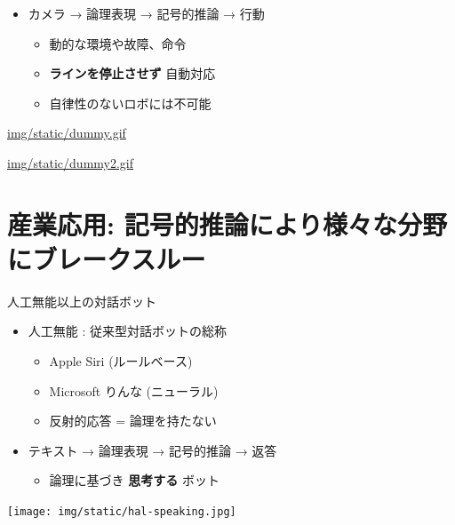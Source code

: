 \begin{container-fluid}
\begin{row-fluid}
\begin{span8}
\begin{itemize}
\item カメラ → 論理表現 → 記号的推論 → 行動

\begin{itemize}
\item 動的な環境や故障、命令

\item \textbf{ラインを停止させず} 自動対応

\item 自律性のないロボには不可能
\end{itemize}
\end{itemize}
\end{span8}
\begin{span4}
\url{img/static/dummy.gif}

\url{img/static/dummy2.gif}
\end{span4}
\end{row-fluid}
\end{container-fluid}

\section{産業応用: \textbf{記号的推論により様々な分野にブレークスルー}}
\label{sec:orgheadline46}

\begin{xlarge}
人工無能以上の対話ボット
\end{xlarge}

\begin{container-fluid}
\begin{row-fluid}
\begin{span6}
\begin{itemize}
\item 人工無能 : 従来型対話ボットの総称
\begin{itemize}
\item Apple Siri (ルールベース)
\item Microsoft りんな (ニューラル)
\item 反射的応答 = 論理を持たない
\end{itemize}
\item テキスト → 論理表現 → 記号的推論 → 返答
\begin{itemize}
\item 論理に基づき \textbf{思考する} ボット
\end{itemize}
\end{itemize}
\end{span6}
\begin{span6}
\texttt{[image: img/static/hal-speaking.jpg]}
\end{span6}
\end{row-fluid}
\end{container-fluid}

